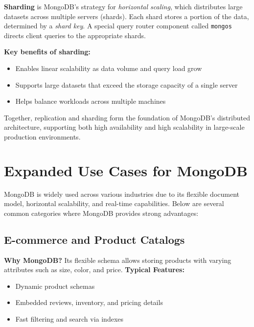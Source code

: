 \documentclass{article}
\begin{document}
\textbf{Sharding} is MongoDB’s strategy for \textit{horizontal scaling}, which distributes large datasets across multiple servers (shards). Each shard stores a portion of the data, determined by a \textit{shard key}. A special query router component called \texttt{mongos} directs client queries to the appropriate shards.

\textbf{Key benefits of sharding:}
\begin{itemize}
    \item Enables linear scalability as data volume and query load grow
    \item Supports large datasets that exceed the storage capacity of a single server
    \item Helps balance workloads across multiple machines
\end{itemize}

Together, replication and sharding form the foundation of MongoDB’s distributed architecture, supporting both high availability and high scalability in large-scale production environments.


\section{Expanded Use Cases for MongoDB}

MongoDB is widely used across various industries due to its flexible document model, horizontal scalability, and real-time capabilities. Below are several common categories where MongoDB provides strong advantages:

\subsection*{E-commerce and Product Catalogs}
\textbf{Why MongoDB?} Its flexible schema allows storing products with varying attributes such as size, color, and price.
\textbf{Typical Features:}
\begin{itemize}
    \item Dynamic product schemas
    \item Embedded reviews, inventory, and pricing details
    \item Fast filtering and search via indexes
\end{itemize}
\end{document}
